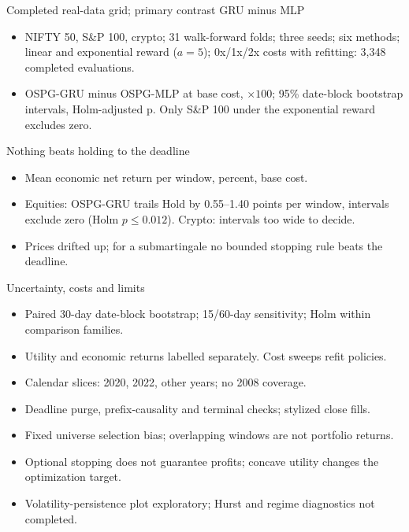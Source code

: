
\begin{frame}{Completed real-data grid; primary contrast GRU minus MLP}
\begin{itemize}\small
\item NIFTY 50, S\&P 100, crypto; 31 walk-forward folds; three seeds; six methods; linear and
  exponential reward ($a=5$); 0x/1x/2x costs with refitting: 3,348 completed evaluations.
\end{itemize}
\vspace{2pt}
\centering\resizebox{\linewidth}{!}{}
\vspace{2pt}
\begin{itemize}\small
\item OSPG-GRU minus OSPG-MLP at base cost, $\times100$; 95\% date-block bootstrap intervals,
  Holm-adjusted p. Only S\&P 100 under the exponential reward excludes zero.
\end{itemize}
\end{frame}

\begin{frame}{Nothing beats holding to the deadline}
\centering\scriptsize
\resizebox{\linewidth}{!}{}
\vspace{4pt}
\begin{itemize}\small
\item Mean economic net return per window, percent, base cost.
\item Equities: OSPG-GRU trails Hold by 0.55--1.40 points per window, intervals exclude zero
  (Holm $p\le0.012$). Crypto: intervals too wide to decide.
\item Prices drifted up; for a submartingale no bounded stopping rule beats the deadline.
\end{itemize}
\end{frame}

\begin{frame}{Uncertainty, costs and limits}
\begin{itemize}
\item Paired 30-day date-block bootstrap; 15/60-day sensitivity; Holm within comparison families.
\item Utility and economic returns labelled separately. Cost sweeps refit policies.
\item Calendar slices: 2020, 2022, other years; no 2008 coverage.
\item Deadline purge, prefix-causality and terminal checks; stylized close fills.
\item Fixed universe selection bias; overlapping windows are not portfolio returns.
\item Optional stopping does not guarantee profits; concave utility changes the optimization target.
\item Volatility-persistence plot exploratory; Hurst and regime diagnostics not completed.
\end{itemize}
\end{frame}

